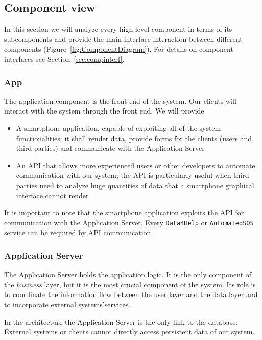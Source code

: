 \documentclass[../DD0.tex]{subfiles}
\begin{document}
  \subsection{Component view}
  \label{sec:compview}

    In this section we will analyze every high-level component in terms of its subcomponents and provide the main interface interaction between different components (Figure~\ref{fig:ComponentDiagram}). For details on component interfaces see Section~\ref{sec:compinterf}.

      \subsubsection{App}

        The application component is the front-end of the system. Our clients will interact with the system through the front end. We will provide
        \begin{itemize}
          \item A smartphone application, capable of exploiting all of the system functionalities: it shall render data, provide forms for the clients (users and third parties) and communicate with the Application Server
          \item An API that allows more experienced users or other developers to automate communication with our system; the API is particularly useful when third parties need to analyze huge quantities of data that a smartphone graphical interface cannot render
        \end{itemize}

        It is important to note that the smartphone application exploits the API for communication with the Application Server. Every \texttt{Data4Help} or \texttt{AutomatedSOS} service can be required by API communication.

      \subsubsection{Application Server}
      \label{sec:applserverinterf}

        The Application Server holds the application logic. It is the only component of the \textit{business} layer, but it is the most crucial component of the system. Its role is to coordinate the information flow between the user layer and the data layer and to incorporate external systems'services.

        In the architecture the Application Server is the only link to the database. External systems or clients cannot directly access persistent data of our system.
\end{document}
